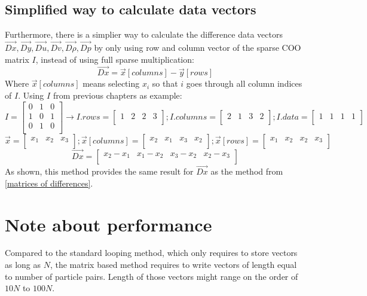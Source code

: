 \documentclass{article}
\begin{document}
\subsection{Simplified way to calculate data vectors}
Furthermore, there is a simplier way to calculate the difference data vectors $\Vec{Dx}, \Vec{Dy}, \Vec{Du}, \Vec{Dv}, \Vec{D\rho}, \Vec{Dp}$ by only using row and column vector of the sparse COO matrix $I$, instead of using full sparse multiplication:
$$\Vec{Dx} = \Vec{x}[columns]-\Vec{y}[rows] $$
Where $\Vec{x}[columns]$ means selecting $x_i$ so that $i$ goes through all column indices of $I$. Using $I$ from previous chapters as example:
$$I = 
\begin{bmatrix}
0 & 1 & 0\\
1 & 0 & 1\\
0 & 1 & 0\\
\end{bmatrix}
\to I.rows = 
\begin{bmatrix}
1 & 2 & 2 & 3\\
\end{bmatrix}
; I.columns = 
\begin{bmatrix}
2 & 1 & 3 & 2\\
\end{bmatrix}
; I.data = 
\begin{bmatrix}
1 & 1 & 1 & 1\\
\end{bmatrix}
$$
$$
\vec{x}=
\begin{bmatrix}
x_1 & x_2 & x_3\\
\end{bmatrix}
; 
\vec{x}[columns]=
\begin{bmatrix}
x_2 & x_1 & x_3 & x_2\\
\end{bmatrix}
; 
\vec{x}[rows]=
\begin{bmatrix}
x_1 & x_2 & x_2 & x_3\\
\end{bmatrix}
$$
$$
\Vec{Dx} = 
\begin{bmatrix}
x_2-x_1 & x_1-x_2 & x_3-x_2 & x_2-x_3\\
\end{bmatrix}
$$
As shown, this method provides the same result for $\Vec{Dx}$ as the method from \ref{matrices of differences}.
\section{Note about performance}
Compared to the standard looping method, which only requires to store vectors as long as $N$, the matrix based method requires to write vectors of length equal to number of particle pairs. Length of those vectors might range on the order of $10N$ to $100N$.
\end{document}
